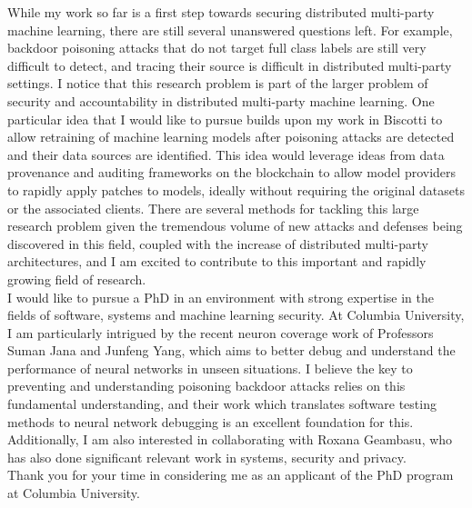 \documentclass[10pt]{article} %
\begin{document}
While my work so far is a first step towards securing distributed multi-party machine learning, there are still several unanswered questions left. For example, backdoor poisoning attacks that do not target full class labels are still very difficult to detect, and tracing their source is difficult in distributed multi-party settings. I notice that this research problem is part of the larger problem of security and accountability in distributed multi-party machine learning. One particular idea that I would like to pursue builds upon my work in Biscotti to allow retraining of machine learning models after poisoning attacks are detected and their data sources are identified. This idea would leverage ideas from data provenance and auditing frameworks on the blockchain to allow model providers to rapidly apply patches to models, ideally without requiring the original datasets or the associated clients. There are several methods for tackling this large research problem given the tremendous volume of new attacks and defenses being discovered in this field, coupled with the increase of distributed multi-party architectures, and I am excited to contribute to this important and rapidly growing field of research. \\

I would like to pursue a PhD in an environment with strong expertise in the fields of software, systems and machine learning security. At Columbia University, I am particularly intrigued by the recent neuron coverage work of Professors Suman Jana and Junfeng Yang, which aims to better debug and understand the performance of neural networks in unseen situations. I believe the key to preventing and understanding poisoning backdoor attacks relies on this fundamental understanding, and their work which translates software testing methods to neural network debugging is an excellent foundation for this. Additionally, I am also interested in collaborating with Roxana Geambasu, who has also done significant relevant work in systems, security and privacy. \\

Thank you for your time in considering me as an applicant of the PhD program at Columbia University.
\end{document}

